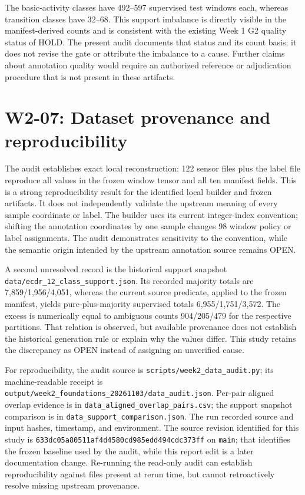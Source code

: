 \documentclass[11pt,a4paper]{article}
\newcommand{\code}[1]{{\small\ttfamily\nolinkurl{#1}}}
\begin{document}
The basic-activity classes have 492--597 supervised test windows each, whereas transition classes have 32--68. This support imbalance is directly visible in the manifest-derived counts and is consistent with the existing Week 1 G2 quality status of HOLD. The present audit documents that status and its count basis; it does not revise the gate or attribute the imbalance to a cause. Further claims about annotation quality would require an authorized reference or adjudication procedure that is not present in these artifacts.

\section{W2-07: Dataset provenance and reproducibility}
The audit establishes exact local reconstruction: 122 sensor files plus the label file reproduce all values in the frozen window tensor and all ten manifest fields. This is a strong reproducibility result for the identified local builder and frozen artifacts. It does not independently validate the upstream meaning of every sample coordinate or label. The builder uses its current integer-index convention; shifting the annotation coordinates by one sample changes 98 window policy or label assignments. The audit demonstrates sensitivity to the convention, while the semantic origin intended by the upstream annotation source remains OPEN.

A second unresolved record is the historical support snapshot \code{data/ecdr_12_class_support.json}. Its recorded majority totals are 7,859/1,956/4,051, whereas the current source predicate, applied to the frozen manifest, yields pure-plus-majority supervised totals 6,955/1,751/3,572. The excess is numerically equal to ambiguous counts 904/205/479 for the respective partitions. That relation is observed, but available provenance does not establish the historical generation rule or explain why the values differ. This study retains the discrepancy as OPEN instead of assigning an unverified cause.

For reproducibility, the audit source is \code{scripts/week2_data_audit.py}; its machine-readable receipt is \code{output/week2_foundations_20261103/data_audit.json}. Per-pair aligned overlap evidence is in \code{data_aligned_overlap_pairs.csv}; the support snapshot comparison is in \code{data_support_comparison.json}. The run recorded source and input hashes, timestamp, and environment. The source revision identified for this study is \code{633dc05a80511af4d4580cd985edd494cdc373ff} on \code{main}; that identifies the frozen baseline used by the audit, while this report edit is a later documentation change. Re-running the read-only audit can establish reproducibility against files present at rerun time, but cannot retroactively resolve missing upstream provenance.
\end{document}
